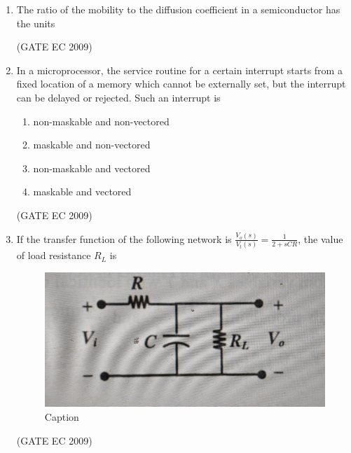 \documentclass[journal,12pt,onecolumn]{IEEEtran}
\theoremstyle{remark}
\begin{document}
\begin{enumerate}[start=1, label={Q\arabic*.}]
\item The ratio of the mobility to the diffusion coefficient in a semiconductor has the units 

\begin{enumerate}[label=(\Alph*)]
\end{enumerate}
\hfill (GATE EC 2009)

\item In a microprocessor, the service routine for a certain interrupt starts from a fixed location of a memory which cannot be externally set, but the interrupt can be delayed or rejected. Such an interrupt is

\begin{enumerate}[label=(\Alph*)]
\item non-maskable and non-vectored 
\item maskable and non-vectored 
\item non-maskable and vectored
\item maskable and vectored

\end{enumerate}
\hfill (GATE EC 2009)

\item If the transfer function of the following network is $\frac{V_o(s)}{V_t(s)} = \frac{1}{2+ sCR}$, the value of load resistance $R_L$ is
\begin{figure}[H]
    \centering
    \includegraphics[width=0.5\linewidth]{images/img_7.jpg}
    \caption{Caption}
    \label{fig:placeholder}
\end{figure}
\begin{enumerate}[label=(\Alph*)]
\end{enumerate}
\hfill (GATE EC 2009)


\end{enumerate}
\end{document}
